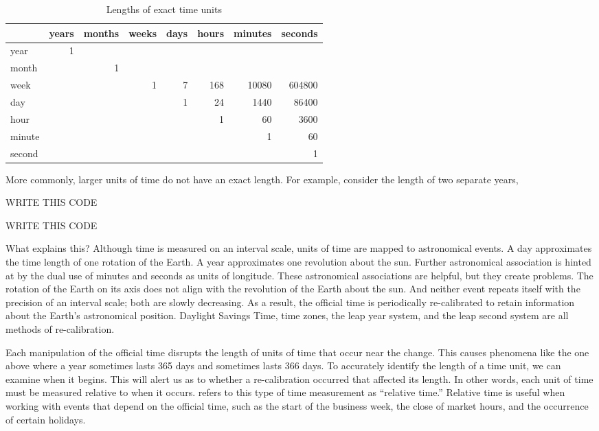 \documentclass[article]{jss}
\begin{document}
\begin{table}
  \caption{Lengths of exact time units}
  \begin{center}
  \begin{tabular}{l|rrrrrrr}
  \multicolumn{1}{r}{} & years & months & weeks & days & hours & minutes & seconds\\
  \hline
  year & 1 & & & & & & \\
  month & & 1 & &&&& \\
  week  & & & 1 & 7 & 168 & 10080 & 604800 \\
  day & & & &1 & 24 & 1440 & 86400\\
  hour  & & & & & 1 & 60 & 3600\\
  minute & & & & & & 1 & 60\\
  second  & & & & & & & 1\\
  \hline
    
  \end{tabular}
  \end{center}
  \label{tbl:exact}
\end{table}


More commonly, larger units of time do not have an exact length. For example, consider the length of two separate years,

 WRITE THIS CODE\\

 WRITE THIS CODE\\

What explains this? Although time is measured on an interval scale, units of time are mapped to astronomical events. A day approximates the time length of one rotation of the Earth. A year approximates one revolution about the sun.  Further astronomical association is hinted at by the dual use of minutes and seconds as units of longitude.  These astronomical associations are helpful, but they create problems. The rotation of the Earth on its axis does not align with the revolution of the Earth about the sun. And neither event repeats itself with the precision of an interval scale; both are slowly decreasing. As a result, the official time is periodically re-calibrated to retain information about the Earth's astronomical position. Daylight Savings Time, time zones, the leap year system, and the leap second system are all methods of re-calibration. 

Each manipulation of the official time disrupts the length of units of time that occur near the change. This causes phenomena like the one above where a year sometimes lasts 365 days and sometimes lasts 366 days. To accurately identify the length of a time unit, we can examine when it begins. This will alert us as to whether a re-calibration occurred that affected its length. In other words, each unit of time must be measured relative to when it occurs.  refers to this type of time measurement as ``relative time.'' Relative time is useful when working with events that depend on the official time, such as the start of the business week, the close of market hours, and the occurrence of certain holidays.
\end{document}
